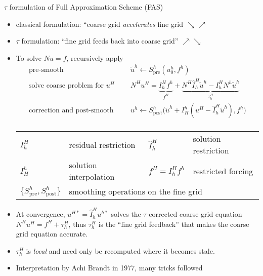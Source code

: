 \begin{frame}{$\tau$ formulation of Full Approximation Scheme (FAS)}
  \begin{itemize}
  \item classical formulation: ``coarse grid \emph{accelerates} fine grid $\searrow \nearrow$
  \item $\tau$ formulation: ``fine grid feeds back into coarse grid'' $\nearrow \searrow$
  \item To solve $N u = f$, recursively apply
    \begin{equation*}
      \begin{split}
        \text{pre-smooth} \:\: & \quad \tilde u^h \gets S^h_{\text{pre}}(u^h_0, f^h) \\
        \text{solve coarse problem for $u^H$} \:\: & \quad N^H u^H = \underbrace{I_h^H f^h}_{f^H} + \underbrace{N^H \hat I_h^H \tilde u^h - I_h^H N^h \tilde u^h}_{\tau_h^H} \\
        \text{correction and post-smooth} \:\: & \quad u^h \gets S^h_{\text{post}} \Big( \tilde u^h + I_H^h (u^H - \hat I_h^H \tilde u^h), f^h \Big) \\
      \end{split}
    \end{equation*}
    \begin{tabular}{llll}
      \toprule
      $I_h^H$ & residual restriction & $\hat I_h^H$ & solution restriction \\
      $I_H^h$ & solution interpolation & $f^H = I_h^H f^h$ & restricted forcing \\
      $\{S^h_{\text{pre}},S^h_{\text{post}}\}$ & \multicolumn{3}{l}{smoothing operations on the fine grid} \\
      \bottomrule
    \end{tabular}
  \item At convergence, $u^{H*} = \hat I_h^H u^{h*}$ solves the $\tau$-corrected coarse grid equation
    $N^H u^H = f^H + \tau_h^H$,
    thus $\tau_h^H$ is the ``fine grid feedback'' that makes the coarse grid equation accurate.
  \item $\tau_h^H$ is \emph{local} and need only be recomputed where it becomes stale.
  \item Interpretation by Achi Brandt in 1977, many tricks followed
  \end{itemize}
\end{frame}
